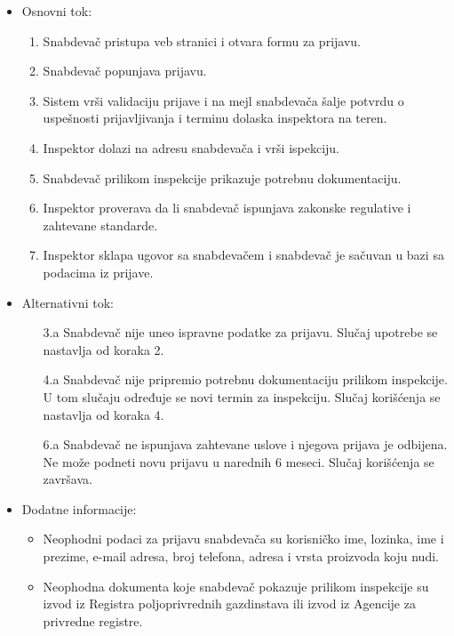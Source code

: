 \begin{itemize}
\begin{itemize}
		\end{itemize}		
	\item Osnovni tok:
		\begin{enumerate}
		    \item Snabdevač pristupa veb stranici i otvara formu za prijavu.
		    \item Snabdevač popunjava prijavu.
		    \item Sistem vrši validaciju prijave i na mejl snabdevača šalje potvrdu o uspešnosti prijavljivanja i terminu dolaska inspektora na teren. 
		    \item Inspektor dolazi na adresu snabdevača i vrši ispekciju.
		    \item Snabdevač prilikom inspekcije prikazuje potrebnu dokumentaciju.
		    \item Inspektor proverava da li snabdevač ispunjava zakonske regulative i zahtevane standarde.
		    \item Inspektor sklapa ugovor sa snabdevačem i snabdevač je sačuvan u bazi sa podacima iz prijave.
		\end{enumerate}
	\item Alternativni tok:
		\begin{itemize}
    		\item[3.a] Snabdevač nije uneo ispravne podatke za prijavu. Slučaj upotrebe se nastavlja od koraka 2.
		    \item[4.a] Snabdevač nije pripremio potrebnu dokumentaciju prilikom inspekcije. U tom slučaju određuje se novi termin za inspekciju. Slučaj korišćenja se nastavlja od koraka 4.
		    \item[6.a] Snabdevač ne ispunjava zahtevane uslove i njegova prijava je odbijena. Ne može podneti novu prijavu u narednih 6 meseci. Slučaj korišćenja se završava.
		\end{itemize}
	\item Dodatne informacije:
		\begin{itemize}
			\item Neophodni podaci za prijavu snabdevača su korisničko ime, lozinka, ime i prezime, e-mail adresa, broj telefona, adresa i vrsta proizvoda koju nudi. 
			\item Neophodna dokumenta koje snabdevač pokazuje prilikom inspekcije su izvod iz Registra poljoprivrednih gazdinstava ili izvod iz Agencije za privredne registre.
		\end{itemize}						
\end{itemize}